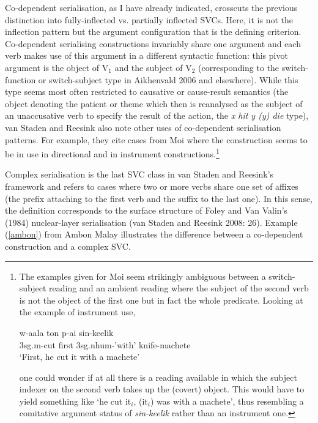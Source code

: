 Co-dependent serialisation, as I have already indicated, crosscuts the previous distinction into fully-inflected vs. partially inflected SVCs. Here, it is not the inflection pattern but the argument configuration that is the defining criterion. Co-dependent serialising constructions invariably share one argument and each verb makes use of this argument in a different syntactic function: this pivot argument is the object of V$_1$ and the subject of V$_2$ (corresponding to the switch-function or switch-subject type in Aikhenvald 2006 and elsewhere). While this type seems most often restricted to causative or cause-result semantics (the object denoting the patient or theme which then is reanalysed as the subject of an unaccusative verb to specify the result of the action, the \textit{x hit y (y) die} type), van Staden and Reesink also note other uses of co-dependent serialisation patterns. For example, they cite cases from Moi where the construction seems to be in use in directional and in instrument constructions.\footnote{The examples given for Moi seem strikingly ambiguous between a switch-subject reading and an ambient reading where the subject of the second verb is not the object of the first one but in fact the whole predicate. Looking at the example of instrument use,

\ea \label{}
\gll w-aala ton p-ai sin-keelik \\
\acs{3}\acs{sg}.\acs{m}-cut first \acs{3}\acs{sg}.\acs{nhum}-'with' knife-machete \\
\glft `First, he cut it with a machete' \\ 
\z
\xe

one could wonder if at all there is a reading available in which the subject indexer on the second verb takes up the (covert) object. This would have to yield something like `he cut it$_i$, (it$_i$) was with a machete', thus resembling a comitative argument status of \textit{sin-keelik} rather than an instrument one.}

Complex serialisation is the last SVC class in van Staden and Reesink's framework and refers to cases where two or more verbs share one set of affixes (the prefix attaching to the first verb and the suffix to the last one). In this sense, the definition corresponds to the surface structure of Foley and Van Valin's (1984) nuclear-layer serialisation (van Staden and Reesink 2008: 26). Example (\ref{ambon}) from Ambon Malay illustrates the difference between a co-dependent construction and a complex SVC.

